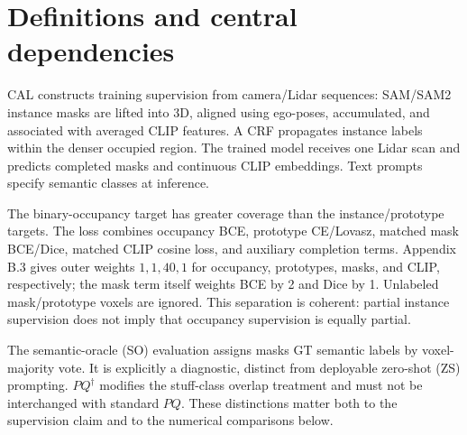 \documentclass[10pt]{article}
\begin{document}
\section*{Definitions and central dependencies}
CAL constructs training supervision from camera/Lidar sequences: SAM/SAM2 instance masks are lifted into 3D, aligned using ego-poses, accumulated, and associated with averaged CLIP features. A CRF propagates instance labels within the denser occupied region. The trained model receives one Lidar scan and predicts completed masks and continuous CLIP embeddings. Text prompts specify semantic classes at inference.\par
The binary-occupancy target has greater coverage than the instance/prototype targets. The loss combines occupancy BCE, prototype CE/Lovasz, matched mask BCE/Dice, matched CLIP cosine loss, and auxiliary completion terms. Appendix B.3 gives outer weights \(1,1,40,1\) for occupancy, prototypes, masks, and CLIP, respectively; the mask term itself weights BCE by 2 and Dice by 1. Unlabeled mask/prototype voxels are ignored. This separation is coherent: partial instance supervision does not imply that occupancy supervision is equally partial.\par
The semantic-oracle (SO) evaluation assigns masks GT semantic labels by voxel-majority vote. It is explicitly a diagnostic, distinct from deployable zero-shot (ZS) prompting. \(PQ^\dagger\) modifies the stuff-class overlap treatment and must not be interchanged with standard \(PQ\). These distinctions matter both to the supervision claim and to the numerical comparisons below.\par
\end{document}
